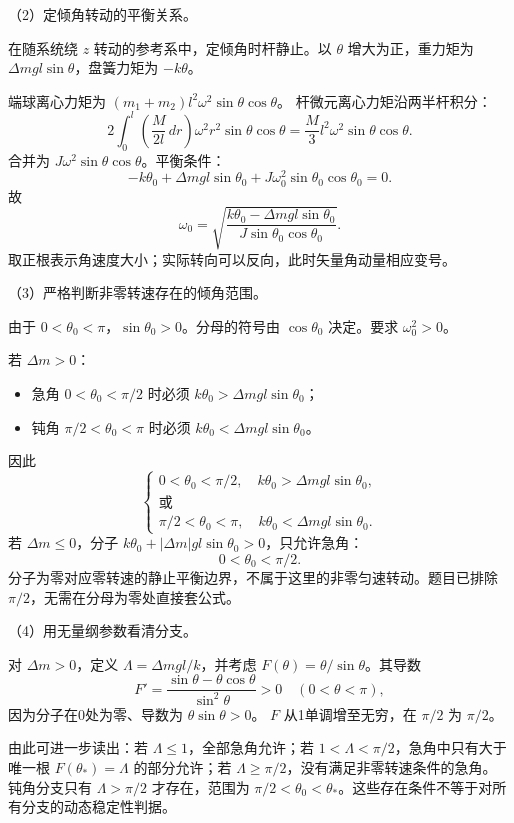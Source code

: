 \documentclass[12pt,a4paper,fontset=fandol]{ctexart}
\providecommand{\tightlist}{\setlength{\itemsep}{0pt}\setlength{\parskip}{0pt}}
\begin{document}
（2）定倾角转动的平衡关系。

在随系统绕 \(z\) 转动的参考系中，定倾角时杆静止。以 \(\theta\)
增大为正，重力矩为 \(\Delta mgl\sin\theta\)，盘簧力矩为 \(-k\theta\)。

端球离心力矩为 \((m_1+m_2)l^2\omega^2\sin\theta\cos\theta\)。
杆微元离心力矩沿两半杆积分： \[
2\int_0^l
\left(\frac{M}{2l}\,dr\right)
\omega^2r^2\sin\theta\cos\theta
=\frac M3l^2\omega^2\sin\theta\cos\theta.
\] 合并为 \(J\omega^2\sin\theta\cos\theta\)。平衡条件： \[
-k\theta_0+\Delta mgl\sin\theta_0
+J\omega_0^2\sin\theta_0\cos\theta_0=0.
\] 故 \[
\boxed{\omega_0=
\sqrt{\frac{k\theta_0-\Delta mgl\sin\theta_0}
{J\sin\theta_0\cos\theta_0}}.}\tag{6.2}
\] 取正根表示角速度大小；实际转向可以反向，此时矢量角动量相应变号。

（3）严格判断非零转速存在的倾角范围。

由于 \(0<\theta_0<\pi\)，\(\sin\theta_0>0\)。分母的符号由
\(\cos\theta_0\) 决定。要求 \(\omega_0^2>0\)。

若 \(\Delta m>0\)：

\begin{itemize}
\tightlist
\item
  急角 \(0<\theta_0<\pi/2\) 时必须
  \(k\theta_0>\Delta mgl\sin\theta_0\)；
\item
  钝角 \(\pi/2<\theta_0<\pi\) 时必须
  \(k\theta_0<\Delta mgl\sin\theta_0\)。
\end{itemize}

因此 \[
\boxed{
\begin{cases}
0<\theta_0<\pi/2,\quad
k\theta_0>\Delta mgl\sin\theta_0,\\
\text{或}\\
\pi/2<\theta_0<\pi,\quad
k\theta_0<\Delta mgl\sin\theta_0.
\end{cases}}\tag{6.3}
\] 若 \(\Delta m\le0\)，分子
\(k\theta_0+|\Delta m|gl\sin\theta_0>0\)，只允许急角： \[
\boxed{0<\theta_0<\pi/2.}\tag{6.4}
\]
分子为零对应零转速的静止平衡边界，不属于这里的非零匀速转动。题目已排除
\(\pi/2\)，无需在分母为零处直接套公式。

（4）用无量纲参数看清分支。

对 \(\Delta m>0\)，定义 \(\Lambda=\Delta mgl/k\)，并考虑
\(F(\theta)=\theta/\sin\theta\)。其导数 \[
F'=\frac{\sin\theta-\theta\cos\theta}{\sin^2\theta}>0
\quad(0<\theta<\pi),
\] 因为分子在0处为零、导数为 \(\theta\sin\theta>0\)。 \(F\)
从1单调增至无穷，在 \(\pi/2\) 为 \(\pi/2\)。

由此可进一步读出：若 \(\Lambda\le1\)，全部急角允许；若
\(1<\Lambda<\pi/2\)，急角中只有大于唯一根 \(F(\theta_*)=\Lambda\)
的部分允许；若 \(\Lambda\ge\pi/2\)，没有满足非零转速条件的急角。
钝角分支只有 \(\Lambda>\pi/2\) 才存在，范围为
\(\pi/2<\theta_0<\theta_*\)。这些存在条件不等于对所有分支的动态稳定性判据。
\end{document}
